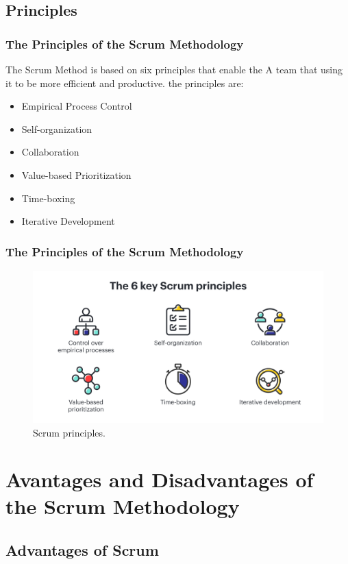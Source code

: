 \documentclass[
	11pt, %
]{beamer}
\begin{document}
\subsection{Principles}

\begin{frame}
	\frametitle{The Principles of the Scrum Methodology}
	The Scrum Method is based on six principles that enable the
	A team that using it to be more efficient and productive.
	the principles are:
	\newline

	\begin{itemize}
		\item Empirical Process Control
		\item Self-organization
		\item Collaboration
		\item Value-based Prioritization
		\item Time-boxing
		\item Iterative Development
	\end{itemize}

\end{frame}

\begin{frame}
	\frametitle{The Principles of the Scrum Methodology}
	\begin{figure}
		\includegraphics[width=0.8\linewidth]{principles.png}
		\caption{Scrum principles.}
	\end{figure}
\end{frame}


\section{Avantages and Disadvantages of the Scrum Methodology}

\subsection{Advantages of Scrum}
\end{document}
